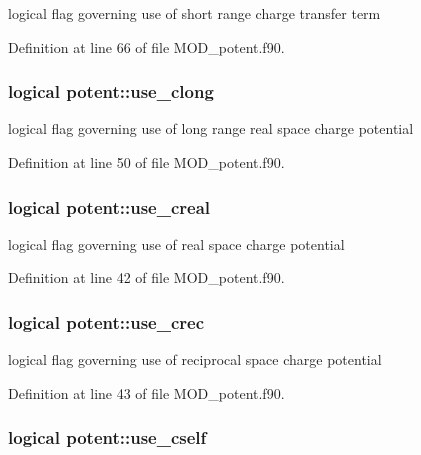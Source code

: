 logical flag governing use of short range charge transfer term 



Definition at line 66 of file M\-O\-D\-\_\-potent.\-f90.

\hypertarget{classpotent_aeb5672c3b82da40d633872040c58b376}{
\subsubsection[{use\-\_\-clong}]{\setlength{\rightskip}{0pt plus 5cm}logical potent\-::use\-\_\-clong}}\label{classpotent_aeb5672c3b82da40d633872040c58b376}


logical flag governing use of long range real space charge potential 



Definition at line 50 of file M\-O\-D\-\_\-potent.\-f90.

\hypertarget{classpotent_a9cacbd79d7d6710802eb97d9fe33b3b7}{
\subsubsection[{use\-\_\-creal}]{\setlength{\rightskip}{0pt plus 5cm}logical potent\-::use\-\_\-creal}}\label{classpotent_a9cacbd79d7d6710802eb97d9fe33b3b7}


logical flag governing use of real space charge potential 



Definition at line 42 of file M\-O\-D\-\_\-potent.\-f90.

\hypertarget{classpotent_a97859e184e6246ff5b45c4563f7d6a75}{
\subsubsection[{use\-\_\-crec}]{\setlength{\rightskip}{0pt plus 5cm}logical potent\-::use\-\_\-crec}}\label{classpotent_a97859e184e6246ff5b45c4563f7d6a75}


logical flag governing use of reciprocal space charge potential 



Definition at line 43 of file M\-O\-D\-\_\-potent.\-f90.

\hypertarget{classpotent_a7ac9d4ba1a8f68a8c11f952cd7985dab}{
\subsubsection[{use\-\_\-cself}]{\setlength{\rightskip}{0pt plus 5cm}logical potent\-::use\-\_\-cself}}\label{classpotent_a7ac9d4ba1a8f68a8c11f952cd7985dab}


